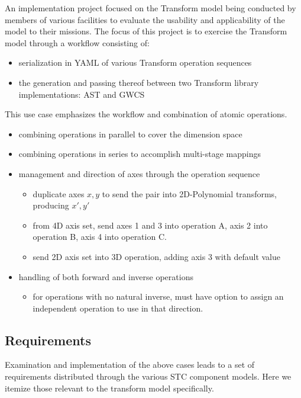 \documentclass[11pt,a4paper]{ivoa}
\begin{document}
  An implementation project focused on the Transform model being conducted by members of various facilities to evaluate the usability and applicability of the model to their missions.  The focus of this project is to exercise the Transform model through a workflow consisting of:
  \begin{itemize}
    \item serialization in YAML of various Transform operation sequences
    \item the generation and passing thereof between two Transform library implementations: AST and GWCS
  \end{itemize}
  This use case emphasizes the workflow and combination of atomic operations.
  \begin{itemize}
    \item combining operations in parallel to cover the dimension space
    \item combining operations in series to accomplish multi-stage mappings
    \item management and direction of axes through the operation sequence
    \begin{itemize}
      \item duplicate axes $x,y$ to send the pair into 2D-Polynomial transforms, producing $x',y'$
      \item from 4D axis set, send axes 1 and 3 into operation A, axis 2 into operation B, axis 4 into operation C.
      \item send 2D axis set into 3D operation, adding axis 3 with default value
    \end{itemize}
    \item handling of both forward and inverse operations
    \begin{itemize}
      \item for operations with no natural inverse, must have option to assign an independent operation to use in that direction.
    \end{itemize}
  \end{itemize}


\subsection{Requirements}
\label{sect:reqs}

 Examination and implementation of the above cases leads to a set of requirements distributed through the various STC component models.  Here we 
itemize those relevant to the transform model specifically.
\end{document}
